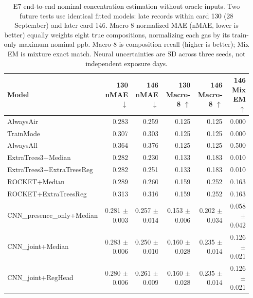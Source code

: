 \begin{table}[t]
\centering\small
\caption{E7 end-to-end nominal concentration estimation without oracle inputs. Two future tests use identical fitted models: late records within card 130 (28 September) and later card 146. Macro-8 normalized MAE (nMAE, lower is better) equally weights eight true compositions, normalizing each gas by its train-only maximum nominal ppb. Macro-8 is composition recall (higher is better); Mix EM is mixture exact match. Neural uncertainties are SD across three seeds, not independent exposure days.}
\label{tab:e7}
\begin{tabular}{@{}lrrrrr@{}}
\toprule
Model & 130 nMAE $\downarrow$ & 146 nMAE $\downarrow$ & 130 Macro-8 $\uparrow$ & 146 Macro-8 $\uparrow$ & 146 Mix EM $\uparrow$ \\
\midrule
AlwaysAir & 0.283 & 0.259 & 0.125 & 0.125 & 0.000 \\
TrainMode & 0.307 & 0.303 & 0.125 & 0.125 & 0.000 \\
AlwaysAll & 0.364 & 0.376 & 0.125 & 0.125 & 0.500 \\
ExtraTrees3+Median & 0.282 & 0.230 & 0.133 & 0.183 & 0.010 \\
ExtraTrees3+ExtraTreesReg & 0.282 & 0.251 & 0.133 & 0.183 & 0.010 \\
ROCKET+Median & 0.289 & 0.260 & 0.159 & 0.252 & 0.163 \\
ROCKET+ExtraTreesReg & 0.313 & 0.316 & 0.159 & 0.252 & 0.163 \\
CNN\_presence\_only+Median & 0.281 $\pm$ 0.003 & 0.257 $\pm$ 0.014 & 0.153 $\pm$ 0.006 & 0.202 $\pm$ 0.034 & 0.058 $\pm$ 0.042 \\
CNN\_joint+Median & 0.283 $\pm$ 0.006 & 0.250 $\pm$ 0.010 & 0.160 $\pm$ 0.028 & 0.235 $\pm$ 0.014 & 0.126 $\pm$ 0.021 \\
CNN\_joint+RegHead & 0.280 $\pm$ 0.006 & 0.261 $\pm$ 0.009 & 0.160 $\pm$ 0.028 & 0.235 $\pm$ 0.014 & 0.126 $\pm$ 0.021 \\
\bottomrule
\end{tabular}
\end{table}
